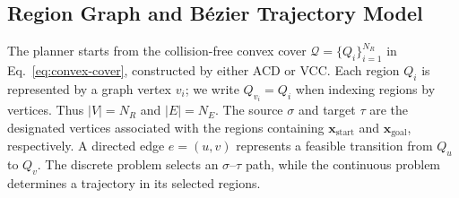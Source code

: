 \subsection{Region Graph and B\'ezier Trajectory Model}
\label{sec:gcs-bezier-model}

The planner starts from the collision-free convex cover
$\mathcal{Q}=\{Q_i\}_{i=1}^{N_R}$ in
Eq.~\eqref{eq:convex-cover}, constructed by either ACD or VCC.  Each region
$Q_i$ is represented by a graph vertex $v_i$; we write $Q_{v_i}=Q_i$ when
indexing regions by vertices.  Thus $|V|=N_R$ and $|E|=N_E$.  The source
$\sigma$ and target $\tau$ are the designated vertices associated with the
regions containing $\mathbf{x}_{\mathrm{start}}$ and
$\mathbf{x}_{\mathrm{goal}}$, respectively.  A directed edge
$e=(u,v)$ represents a feasible transition from $Q_u$ to $Q_v$.  The discrete
problem selects an $\sigma$--$\tau$ path, while the continuous problem
determines a trajectory in its selected regions.


